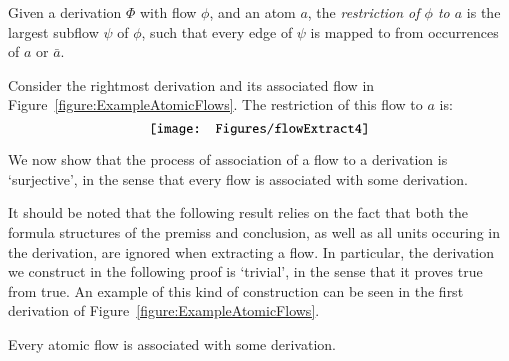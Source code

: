 \begin{definition}\label{definiton:FlowRestriction}
Given a derivation $\Phi$ with flow $\phi$, and an atom $a$, the \emph{restriction of $\phi$ to $a$} is the largest subflow $\psi$ of $\phi$, such that every edge of $\psi$ is mapped to from occurrences of $a$ or $\bar a$.
\end{definition}

\begin{example}
Consider the rightmost derivation and its associated flow in Figure~\vref{figure:ExampleAtomicFlows}. The restriction of this flow to $a$ is:
\[
\vcenter{\hbox{\texttt{[image: Figures/flowExtract4]}}}
\]
\end{example}

We now show that the process of association of a flow to a derivation is `surjective', in the sense that every flow is associated with some derivation.

It should be noted that the following result relies on the fact that both the formula structures of the premiss and conclusion, as well as all units occuring in the derivation, are ignored when extracting a flow. In particular, the derivation we construct in the following proof is `trivial', in the sense that it proves true from true. An example of this kind of construction can be seen in the first derivation of Figure~\vref{figure:ExampleAtomicFlows}.

\begin{theorem}\label{theorem:SurjectiveDerToFlow}
Every atomic flow is associated with some derivation.
\end{theorem}

